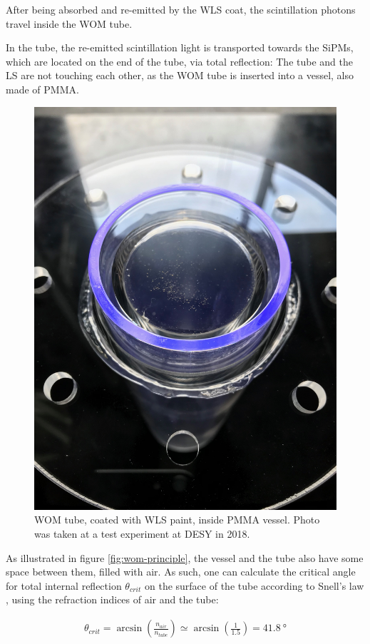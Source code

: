 	After being absorbed and re-emitted by the \ac{WLS} coat, the scintillation photons travel inside the \ac{WOM} tube. 

	In the tube, the re-emitted scintillation light is transported towards the \acsp{SiPM}, which are located on the end of the tube, via total reflection: The tube and the \ac{LS} are not touching each other, as the \ac{WOM} tube is inserted into a vessel, also made of \ac{PMMA}.
	
	
	
	
	\begin{figure}[h]
		\centering
		\includegraphics[width=.5\textwidth]{pictures/WOM_Vessel_TB18_top.jpeg}
		\caption{\ac{WOM} tube, coated with \ac{WLS} paint, inside \ac{PMMA} vessel. Photo was taken at a test experiment at \ac{DESY} in 2018.}
		\label{fig:WOM-tube}
	\end{figure}
	
	As illustrated in figure \ref{fig:wom-principle}, the vessel and the tube also have some space between them, filled with air. As such, one can calculate the critical angle for total internal reflection $\theta_{crit}$ on the surface of the tube according to Snell's law \cite{ZINTH}, using the refraction indices of air and the tube:
	
	\begin{align}
		\theta_{crit} = \arcsin(\frac{n_{air}}{n_{tube}}) \simeq \arcsin(\frac{1}{1.5}) = \SI{41.8}{\degree}
	\end{align}

